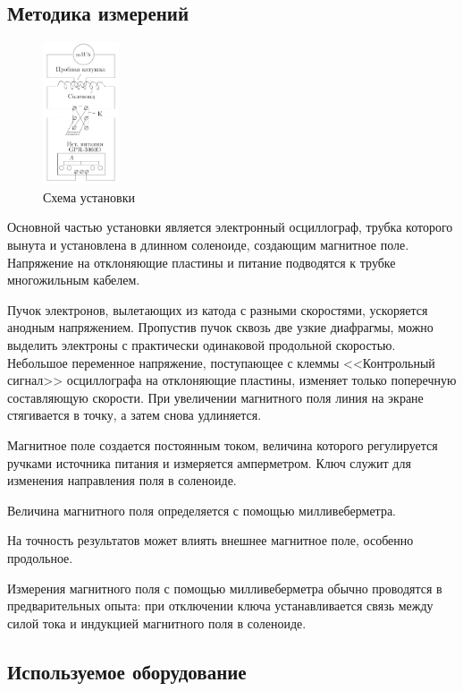 \documentclass[a4paper, 12pt]{article}
\begin{document}
\subsection{Методика измерений}

\begin{figure}
  \begin{center}
    \includegraphics[width = 0.2\textwidth]{1.png}
  \end{center}
  \caption{Схема установки}
\end{figure}
Основной частью установки является электронный осциллограф, трубка которого вынута и установлена в длинном соленоиде, создающим магнитное поле. Напряжение на отклоняющие пластины и питание подводятся к трубке многожильным кабелем.

Пучок электронов, вылетающих из катода с разными скоростями, ускоряется анодным напряжением. Пропустив пучок сквозь две узкие диафрагмы, можно выделить электроны с практически одинаковой продольной скоростью. Небольшое переменное напряжение, поступающее с клеммы <<Контрольный сигнал>> осциллографа на отклоняющие пластины, изменяет только поперечную составляющую скорости. При увеличении магнитного поля линия на экране стягивается в точку, а затем снова удлиняется. 

Магнитное поле создается постоянным током, величина которого регулируется ручками источника питания и измеряется амперметром. Ключ служит для изменения направления поля в соленоиде.

Величина магнитного поля определяется с помощью милливеберметра.

На точность результатов может влиять внешнее магнитное поле, особенно продольное. 

Измерения магнитного поля с помощью милливеберметра обычно проводятся в предварительных опыта: при отключении ключа устанавливается связь между силой тока и индукцией магнитного поля в соленоиде. 

\subsection{Используемое оборудование}
\end{document}
